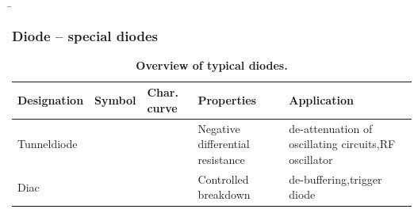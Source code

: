 \begin{frame}
    \renewcommand{\tablename}{Table}
    \b{
        \frametitle{Diode -- special diodes}
        \begin{table}[H]
            \centering 
            \begin{tabular}{ |p{2.1cm}|p{1.4cm}|p{3.2cm}|p{2.8cm}|p{3cm}| }
                \hline
                \textbf{Designation} & \textbf{Symbol} & \textbf{Char. curve} & \textbf{Properties} & \textbf{Application} \\
                \hline
                Tunnel\-diode
                &
                \begin{minipage}[t][2.6cm][c]{1.4cm}
                    \centering 
                \end{minipage}
                & 
                \begin{minipage}[t][2.6cm][c]{3.3cm}
                    \centering 
                \end{minipage}
                & 
                Negative differential resistance &
                de-attenuation of oscillating circuits,\newline RF oscillator\\
                \hline
                Diac
                &
                \begin{minipage}[t][2.6cm][c]{1.4cm}
                    \centering 
                \end{minipage}
                & 
                \begin{minipage}[t][2.6cm][c]{3.3cm}
                    \centering 
                \end{minipage}
                & 
                Controlled breakdown & 
                de-buffering,\newline trigger diode\\
                \hline
        \end{tabular}
        \caption{\textbf{Overview of typical diodes.}}
    \end{table}
    }

\end{frame}

